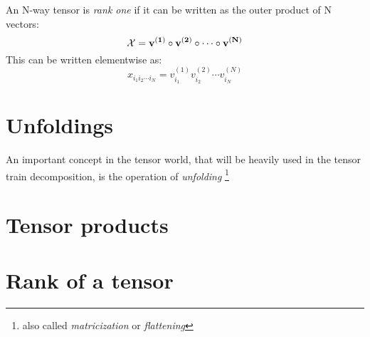 \begin{Def}
  An N-way tensor  is \emph{rank one} if it can be written as the outer product of N vectors:
  \[
  \mathcal{X} = \mathbf{v^{(1)}} \circ \mathbf{v^{(2)}} \circ \cdots \circ \mathbf{v^{(N)}}
  \]
  This can be written elementwise as:
  \[
  x_{i_1 i_2 \cdots i_N} = v_{i_1}^{(1)} v_{i_2}^{(2)} \cdots v_{i_N}^{(N)}
  \]
\end{Def}

\section{Unfoldings}
An important concept in the tensor world, that will be heavily used in the tensor train decomposition, is the operation of \emph{unfolding} \footnote{also called \emph{matricization} or \emph{flattening}}

\section{Tensor products}


\section{Rank of a tensor}
